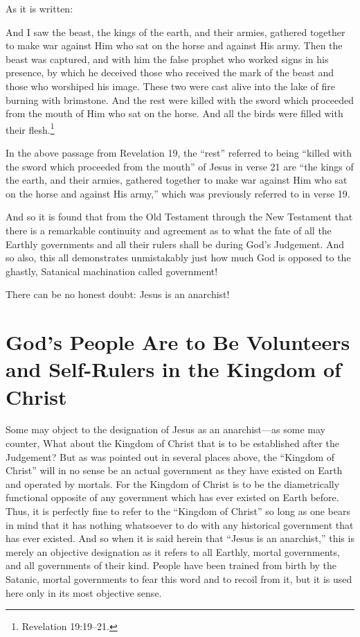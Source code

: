 \documentclass[letterpaper,12pt]{article}
\newenvironment{squote}
  {\small\quote}
  {\endquote\normalsize}
\begin{document}
As it is written:

\begin{squote}
And I saw the beast, the kings of the earth, and their armies, gathered together to make war against Him who sat on the horse and against His army. Then the beast was captured, and with him the false prophet who worked signs in his presence, by which he deceived those who received the mark of the beast and those who worshiped his image. These two were cast alive into the lake of fire burning with brimstone. And the rest were killed with the sword which proceeded from the mouth of Him who sat on the horse. And all the birds were filled with their flesh.\footnote{Revelation 19:19--21.}
\end{squote}

In the above passage from Revelation 19, the ``rest'' referred to being ``killed with the sword which proceeded from the mouth'' of Jesus in verse 21 are ``the kings of the earth, and their armies, gathered together to make war against Him who sat on the horse and against His army,'' which was previously referred to in verse 19.

And so it is found that from the Old Testament through the New Testament that there is a remarkable continuity and agreement as to what the fate of all the Earthly governments and all their rulers shall be during God's Judgement. And so also, this all demonstrates unmistakably just how much God is opposed to the ghastly, Satanical machination called government!

There can be no honest doubt: Jesus is an anarchist!

\section{God's People Are to Be Volunteers and Self-Rulers in the Kingdom of Christ}
\label{sec:GodSPeopleAreToBeVolunteersAndSelfRulersInTheKingdomOfChrist}

Some may object to the designation of Jesus as an anarchist---as some may counter, What about the Kingdom of Christ that is to be established after the Judgement? But as was pointed out in several places above, the ``Kingdom of Christ'' will in no sense be an actual government as they have existed on Earth and operated by mortals. For the Kingdom of Christ is to be the diametrically functional opposite of any government which has ever existed on Earth before. Thus, it is perfectly fine to refer to the ``Kingdom of Christ'' so long as one bears in mind that it has nothing whatsoever to do with any historical government that has ever existed. And so when it is said herein that ``Jesus is an anarchist,'' this is merely an objective designation as it refers to all Earthly, mortal governments, and all governments of their kind. People have been trained from birth by the Satanic, mortal governments to fear this word and to recoil from it, but it is used here only in its most objective sense.
\end{document}
